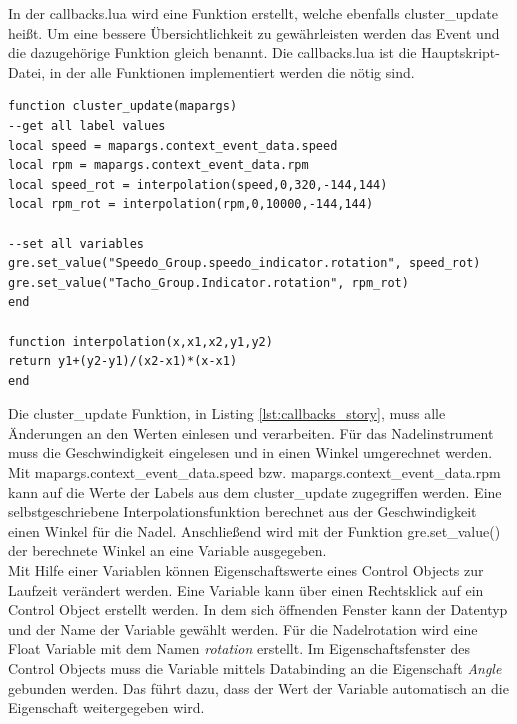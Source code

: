 In der callbacks.lua wird eine Funktion erstellt, welche ebenfalls \glqq cluster\_update\grqq{} heißt. Um eine bessere Übersichtlichkeit zu gewährleisten werden das Event und die dazugehörige Funktion gleich benannt. Die callbacks.lua ist die Hauptskript-Datei, in der alle Funktionen implementiert werden die nötig sind. \\

\newpage

\lstset{language=[5.0]Lua}
\begin{lstlisting}[frame=htrbl, caption={callbacks.lua}, label={lst:callbacks_story}]
function cluster_update(mapargs)
--get all label values 
local speed = mapargs.context_event_data.speed
local rpm = mapargs.context_event_data.rpm
local speed_rot = interpolation(speed,0,320,-144,144)
local rpm_rot = interpolation(rpm,0,10000,-144,144)

--set all variables
gre.set_value("Speedo_Group.speedo_indicator.rotation", speed_rot)
gre.set_value("Tacho_Group.Indicator.rotation", rpm_rot)
end

function interpolation(x,x1,x2,y1,y2)
return y1+(y2-y1)/(x2-x1)*(x-x1)
end
\end{lstlisting}

Die \glqq cluster\_update\grqq{} Funktion, in Listing \ref{lst:callbacks_story}, muss alle Änderungen an den Werten einlesen und verarbeiten. Für das Nadelinstrument muss die Geschwindigkeit eingelesen und in einen Winkel umgerechnet werden. Mit \glqq mapargs.context\_event\_data.speed\grqq{} bzw. \glqq mapargs.context\_event\_data.rpm\grqq{} kann auf die Werte der Labels aus dem cluster\_update zugegriffen werden. Eine selbstgeschriebene Interpolationsfunktion berechnet aus der Geschwindigkeit einen Winkel für die Nadel. Anschließend wird mit der Funktion \glqq gre.set\_value()\grqq{} der berechnete Winkel an eine Variable ausgegeben.\\

Mit Hilfe einer Variablen können Eigenschaftswerte eines Control Objects zur Laufzeit verändert werden. Eine Variable kann über einen Rechtsklick auf ein Control Object erstellt werden. In dem sich öffnenden Fenster kann der Datentyp und der Name der Variable gewählt werden. Für die Nadelrotation wird eine Float Variable mit dem Namen \textit{rotation} erstellt. Im Eigenschaftsfenster des Control Objects muss die Variable mittels Databinding an die Eigenschaft \textit{Angle} gebunden werden. Das führt dazu, dass der Wert der Variable automatisch an die Eigenschaft weitergegeben wird.\\

